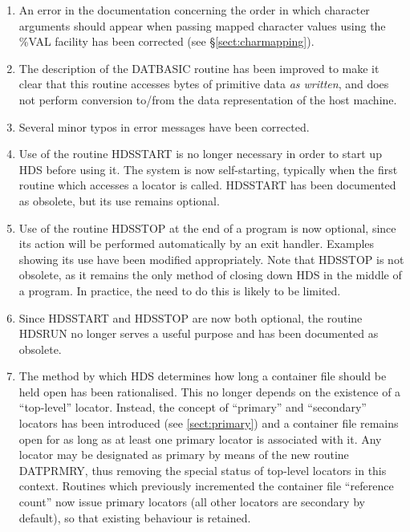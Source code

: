 \documentclass[twoside,11pt]{article}
\newcommand{\htmlref}[2]{#1}
\renewcommand{\_}{\texttt{\symbol{95}}}
\newcommand{\qt}[1]{``#1''}
\newcommand{\st}[1]{{\em{#1}}}
\newcommand{\qt}[1]{{\tt{"}}#1{\tt{"}}}
\begin{document}
\begin{enumerate}
\item
An error in the documentation concerning the order in which character
arguments should appear when passing mapped character values using the
\%VAL facility has been corrected (see \S\ref{sect:charmapping}).

\item
The description of the \htmlref{DAT\_BASIC}{DAT_BASIC} routine has
been improved to make it clear that this routine accesses bytes of
primitive data \st{as written}, and does not perform conversion
to/from the data representation of the host machine.

\item
Several minor typos in error messages have been corrected.

\item
Use of the routine \htmlref{HDS\_START}{HDS_START} is no longer
necessary in order to start up HDS before using it. The system is now
self-starting, typically when the first routine which accesses a
\htmlref{locator}{sect:locators} is called. HDS\_START has been documented
as obsolete, but its use remains optional.

\item
Use of the routine \htmlref{HDS\_STOP}{HDS_STOP} at the end of a
program is now optional, since its action will be performed
automatically by an exit handler. Examples showing its use have been
modified appropriately. Note that HDS\_STOP is not obsolete, as it
remains the only method of closing down HDS in the middle of a
program. In practice, the need to do this is likely to be limited.

\item
Since \htmlref{HDS\_START}{HDS_START} and
\htmlref{HDS\_STOP}{HDS_STOP} are now both optional, the routine
\htmlref{HDS\_RUN}{HDS_RUN} no longer serves a useful purpose and has
been documented as obsolete.

\item
The method by which HDS determines how long a container file should be
held open has been rationalised. This no longer depends on the
existence of a \qt{top-level}
\htmlref{locator}{sect:locators}. Instead, the concept of \qt{primary}
and \qt{secondary} locators has been introduced (see
\ref{sect:primary}) and a container file remains open for as long as
at least one primary locator is associated with it.  Any locator may
be designated as primary by means of the new routine
\htmlref{DAT\_PRMRY}{DAT_PRMRY}, thus removing the special status of
top-level locators in this context. Routines which previously
incremented the container file \htmlref{\qt{reference
count}}{sect:refct} now issue primary locators (all other locators are
secondary by default), so that existing behaviour is retained.


\end{enumerate}
\end{document}
